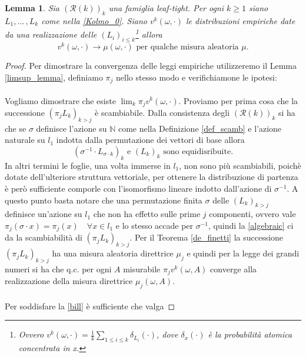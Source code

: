\documentclass[11pt, twoside]{report}
\newcommand{\Rr}{\mathscr{R}}
\theoremstyle{definition}
\theoremstyle{plain}
\newtheorem{lemma}[teo]{Lemma}
\theoremstyle{remark}
\numberwithin{equation}{chapter}
\begin{document}
\begin{lemma} \label{empiric_lemma}
Sia $(\Rr(k))_k$ una famiglia leaf-tight. Per ogni $k \geq 1$ siano $L_1, ...\, , L_k$ come nella \eqref{Kolmo_0}. Siano $v^k(\omega, \cdot)$ le distribuzioni empiriche date da una realizzazione delle $(L_i)_{i \leq k}$\footnote{Ovvero $v^k(\omega, \cdot)= \frac{1}{k}\sum\limits_{1\leq i\leq k} \delta_{L_i}(\cdot)$, dove $\delta_x(\cdot)$ è la probabilità atomica concentrata in x.} allora
\begin{equation}
v^k(\omega, \cdot) \rightarrow \mu(\omega, \cdot) \text{ per qualche misura aleatoria } \mu.
\end{equation}
\end{lemma}
\begin{proof}
Per dimostrare la convergenza delle leggi empiriche utilizzeremo il Lemma \ref{limsup_lemma}, definiamo $\pi_j$ nello stesso modo e verifichiamone le ipotesi:\\
\\
Vogliamo dimostrare che esiste $\lim_k\pi_j v^k(\omega, \cdot)$. Proviamo per prima cosa che la successione $(\pi_j L_k)_{k>j}$ è scambiabile. Dalla consistenza degli $(\Rr(k))_k$ si ha che se $\sigma$ definisce l'azione su $\mathbb{N}$ come nella Definizione \ref{def_scamb} e l'azione naturale su $l_1$ indotta dalla permutazione dei vettori di base allora
\begin{equation} \label{algebraic}
(\sigma^{-1} \cdot L_{\sigma\cdot k})_k \text{ e } (L_k)_k \text{ sono equidisribuite.}
\end{equation}In altri termini le foglie, una volta immerse in $l_1$, non sono più scambiabili, poichè dotate dell'ulteriore struttura vettoriale, per ottenere la distribuzione di partenza è però sufficiente comporle con l'isomorfismo lineare indotto dall'azione di $\sigma^{-1}$. A questo punto basta notare che una permutazione finita $\sigma$ delle $(L_k)_{k>j}$ definisce un'azione su $l_1$ che non ha effetto sulle prime $j$ componenti, ovvero vale $\pi_j (\sigma \cdot x) = \pi_j( x) \quad \forall x \in l_1$ e lo stesso accade per $\sigma^{-1}$, quindi la \eqref{algebraic} ci da la scambiabilità di $(\pi_j L_k)_{k>j}$. Per il Teorema \ref{de_finetti} la successione $(\pi_j L_k)_{k>j}$ ha una misura aleatoria direttrice $\mu_j$ e quindi per la legge dei grandi numeri si ha che q.c. per ogni $A$ misurabile $\pi_j v^k(\omega, A)$ converge alla realizzazione della misura direttrice $\mu_j(\omega, A)$.\\
\\
Per soddisfare la \eqref{bill} è sufficiente che valga

\end{proof}
\end{document}
